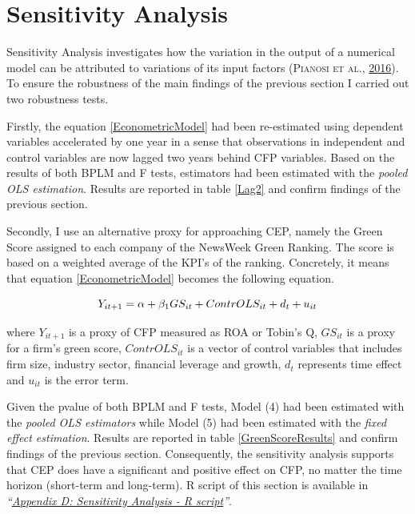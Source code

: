 \documentclass[12pt,]{article}
\begin{document}
\FloatBarrier
\newpage
{}

\hypertarget{sensitivity-analysis}{\section{Sensitivity
Analysis}\label{sensitivity-analysis}}

Sensitivity Analysis investigates how the variation in the output of a
numerical model can be attributed to variations of its input factors
(\textsc{Pianosi et al.}, \protect\hyperlink{ref-Pianosi2016}{2016}). To
ensure the robustness of the main findings of the previous section I
carried out two robustness tests.

Firstly, the equation \ref{EconometricModel} had been re-estimated using
dependent variables accelerated by one year in a sense that observations
in independent and control variables are now lagged two years behind CFP
variables. Based on the results of both BPLM and F tests, estimators had
been estimated with the \emph{pooled OLS estimation}. Results are
reported in table \ref{Lag2} and confirm findings of the previous
section.

Secondly, I use an alternative proxy for approaching CEP, namely the
Green Score assigned to each company of the NewsWeek Green Ranking. The
score is based on a weighted average of the KPI's of the ranking.
Concretely, it means that equation \ref{EconometricModel} becomes the
following equation.

\begin{equation}
\centering
Y_{it+1} = \alpha + \beta_{1} GS_{it} + ContrOLS_{it} + d_{t} + u_{it}
\label{GreenScoreEquation}
\end{equation}

where \(Y_{it+1}\) is a proxy of CFP measured as ROA or Tobin's Q,
\(GS_{it}\) is a proxy for a firm's green score, \(ContrOLS_{it}\) is a
vector of control variables that includes firm size, industry sector,
financial leverage and growth, \(d_{t}\) represents time effect and
\(u_{it}\) is the error term.

Given the pvalue of both BPLM and F tests, Model (4) had been estimated
with the \emph{pooled OLS estimators} while Model (5) had been estimated
with the \emph{fixed effect estimation}. Results are reported in table
\ref{GreenScoreResults} and confirm findings of the previous section.
Consequently, the sensitivity analysis supports that CEP does have a
significant and positive effect on CFP, no matter the time horizon
(short-term and long-term). R script of this section is available in
\emph{``\protect\hyperlink{appendix-d-sensitivity-analysis---r-script}{Appendix
D: Sensitivity Analysis - R script}''}.
\end{document}
